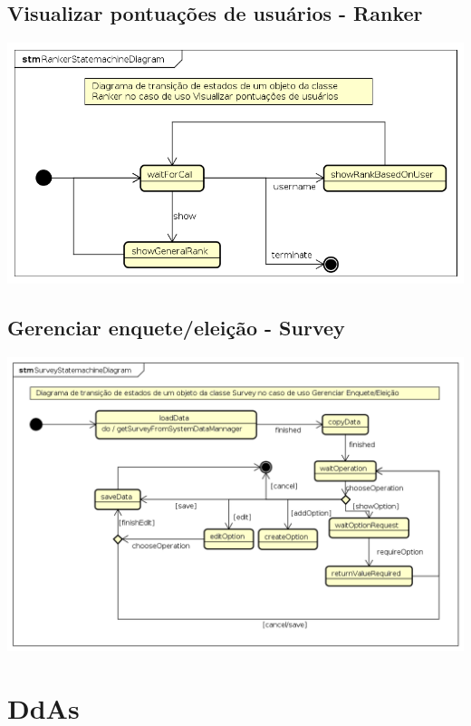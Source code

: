 \documentclass[a4paper,12pt]{report}
\begin{document}
\subsection*{Visualizar pontuações de usuários - Ranker}
\markright{}
\includegraphics[width=14.3cm]{statemachine_diagrams/RankerStatemachineDiagram.png}

\subsection*{Gerenciar enquete/eleição - Survey}
\markright{}
\includegraphics[width=14.3cm]{statemachine_diagrams/SurveyStatemachineDiagram.png}

\section*{DdAs}
\markright{}
\end{document}
